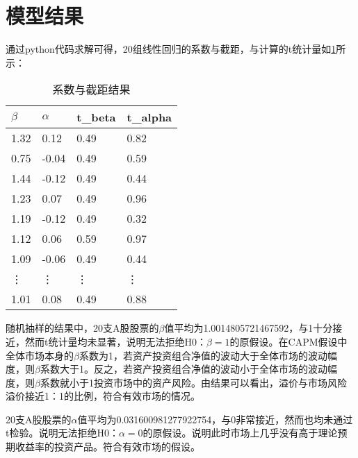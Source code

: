 \documentclass{xjtureport}
\begin{document}
\section{模型结果}
通过python代码求解可得，20组线性回归的系数与截距，与计算的t统计量如\ref{表}所示：
\begin{table}[H]
    \centering
    \caption{系数与截距结果}
    \label{表}
    \begin{tabular}{@{}llll@{}}
    \toprule
    \textbf{$\beta$} & \textbf{$\alpha$} & \textbf{t\_beta} & \textbf{t\_alpha} \\ \midrule
    1.32                          & 0.12                           & 0.49             & 0.82              \\
    0.75                          & -0.04                          & 0.49             & 0.59              \\
    1.44                          & -0.12                          & 0.49             & 0.44              \\
    1.23                          & 0.07                           & 0.49             & 0.96              \\
    1.19                          & -0.12                          & 0.49             & 0.32              \\
    1.12                          & 0.06                           & 0.59             & 0.97              \\
    1.09                          & -0.06                          & 0.49             & 0.44              \\
    \vdots                              &\vdots                                & \vdots                 &  \vdots                 \\
    1.01                          & 0.08                           & 0.49             & 0.88              \\ \bottomrule
    \end{tabular}
    \end{table}
随机抽样的结果中，20支A股股票的$\beta$值平均为1.0014805721467592，与1十分接近，然而t统计量均未显著，说明无法拒绝H0：$\beta=1$的原假设。在CAPM假设中全体市场本身的$\beta$系数为1，若资产投资组合净值的波动大于全体市场的波动幅度，则$\beta$系数大于1。反之，若资产投资组合净值的波动小于全体市场的波动幅度，则$\beta$系数就小于1投资市场中的资产风险。由结果可以看出，溢价与市场风险溢价接近1：1的比例，符合有效市场的情况。
\par 20支A股股票的$\alpha$值平均为0.031600981277922754，与0非常接近，然而也均未通过t检验。说明无法拒绝H0：$\alpha=0$的原假设。说明此时市场上几乎没有高于理论预期收益率的投资产品。符合有效市场的假设。
\end{document}
